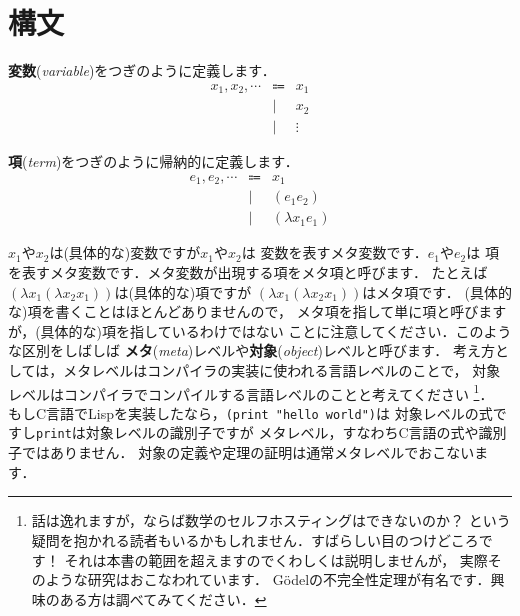 \documentclass{ltjsbook}%
\newcommand\term[2]{\textbf{#1}{(\textit{#2})}}%
\begin{document}
\section{構文}%
\label{untyped:syntax}%
\par\term{変数}{variable}をつぎのように定義します．%
\begin{equation}%
  \begin{array}{lrl}%
    \mathit{x}_1,\mathit{x}_2,\cdots%
    & \Coloneqq & x_1\\%
    &         | & x_2\\%
    &         | & \vdots%
  \end{array}%
\end{equation}%
\par\term{項}{term}をつぎのように帰納的に定義します．%
\begin{equation}%
  \begin{array}{lrl}%
    \mathit{e}_1,\mathit{e}_2,\cdots%
    & \Coloneqq & \mathit{x}_1\\%
    &         | & (\mathit{e}_1\mathit{e}_2)\\%
    &         | & (\lambda\mathit{x}_1\mathit{e}_1)%
  \end{array}%
\end{equation}%
\par$x_1$や$x_2$は(具体的な)変数ですが$\mathit{x}_1$や$\mathit{x}_2$は%
変数を表すメタ変数です．$\mathit{e}_1$や$\mathit{e}_2$は%
項を表すメタ変数です．メタ変数が出現する項をメタ項と呼びます．%
たとえば$(\lambda x_1(\lambda x_2x_1))$は(具体的な)項ですが%
$(\lambda\mathit{x}_1(\lambda\mathit{x}_2\mathit{x}_1))$はメタ項です．%
(具体的な)項を書くことはほとんどありませんので，%
メタ項を指して単に項と呼びますが，(具体的な)項を指しているわけではない%
ことに注意してください．このような区別をしばしば%
\term{メタ}{meta}レベルや\term{対象}{object}レベルと呼びます．%
\iffalse%
考え方としては，メタレベルはコンパイラの実装に使われる言語レベルのことで，%
対象レベルはコンパイラでコンパイルする言語レベルのことと考えてください%
\footnote{話は逸れますが，ならば数学のセルフホスティングはできないのか？%
  という疑問を抱かれる読者もいるかもしれません．すばらしい目のつけどころです！%
  それは本書の範囲を超えますのでくわしくは説明しませんが，%
  実際そのような研究はおこなわれています．%
  Gödelの不完全性定理が有名です．興味のある方は調べてみてください．}．%
もしC言語でLispを実装したなら，\texttt{(print "hello world")}は%
対象レベルの式ですし\texttt{print}は対象レベルの識別子ですが%
メタレベル，すなわちC言語の式や識別子ではありません．%
対象の定義や定理の証明は通常メタレベルでおこないます．%
\end{document}
